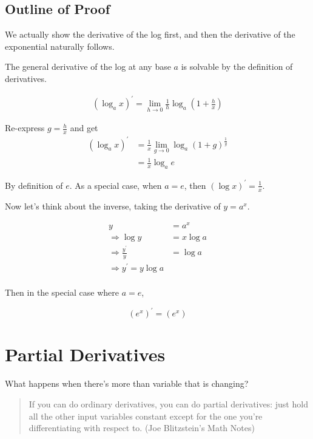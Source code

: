 \documentclass[]{book}
\theoremstyle{definition}
\theoremstyle{definition}
\theoremstyle{definition}
\theoremstyle{remark}
\begin{document}
\hypertarget{outline-of-proof}{%
\subsection*{Outline of Proof}\label{outline-of-proof}}

We actually show the derivative of the log first, and then the derivative of the exponential naturally follows.

The general derivative of the log at any base \(a\) is solvable by the definition of derivatives.

\begin{align*}
(\log_a x)^\prime = \lim\limits_{h\to 0} \frac{1}{h}\log_{a}\left(1 + \frac{h}{x}\right)
\end{align*}

Re-express \(g = \frac{h}{x}\) and get
\begin{align*}
(\log_a x)^\prime &= \frac{1}{x}\lim_{g\to 0}\log_{a} (1 + g)^{\frac{1}{g}}\\
&= \frac{1}{x}\log_a e
\end{align*}

By definition of \(e\). As a special case, when \(a = e\), then \((\log x)^\prime = \frac{1}{x}\).

Now let's think about the inverse, taking the derivative of \(y = a^x\).

\begin{align*}
y &= a^x \\
\Rightarrow \log y &= x \log a\\
\Rightarrow \frac{y^\prime}{y} &= \log a\\
\Rightarrow  y^\prime = y \log a\\
\end{align*}

Then in the special case where \(a = e\),

\[(e^x)^\prime = (e^x)\]

\hypertarget{partial-derivatives}{%
\section{Partial Derivatives}\label{partial-derivatives}}

What happens when there's more than variable that is changing?

\begin{quote}
If you can do ordinary derivatives, you can do partial derivatives: just hold all the other input variables constant except for the one you're differentiating with respect to. (Joe Blitzstein's Math Notes)
\end{quote}
\end{document}
